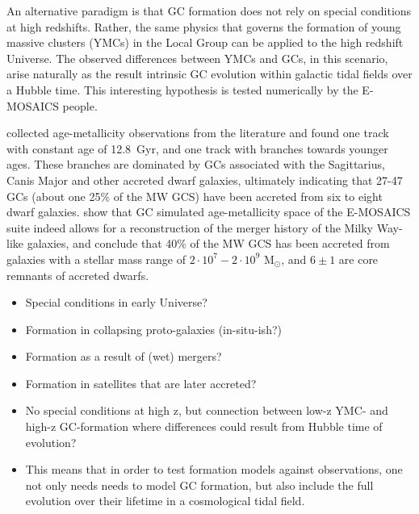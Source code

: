 \documentclass[a4paper,fleqn,usenatbib]{mnras}
\newcommand{\Sun}[0]{\ensuremath{_{\odot}}}
\begin{document}
An alternative paradigm is that GC formation does not rely on special conditions
at high redshifts. Rather, the same physics that governs the formation of young 
massive clusters (YMCs) in the Local Group can be applied to the high redshift
Universe. The observed differences between YMCs and GCs, in this scenario, arise
naturally as the result intrinsic GC evolution within galactic tidal fields over
a Hubble time. This interesting hypothesis is tested numerically by the E-MOSAICS
people.


\citet{2010MNRAS.404.1203F} collected age-metallicity observations from the
literature and found one track with constant age of 12.8~Gyr, and one track
with branches towards younger ages. These branches are dominated by GCs associated 
with the Sagittarius, Canis Major and other accreted dwarf galaxies, ultimately
indicating that 27-47 GCs (about one 25\% of the MW GCS) have been accreted
from six to eight dwarf galaxies. \citet{2019MNRAS.486.3134K, 2019MNRAS.486.3180K}
show that GC simulated age-metallicity space of the E-MOSAICS suite indeed allows 
for a reconstruction of the merger history of the Milky Way-like galaxies, and 
conclude that 40\% of the MW GCS has been accreted from galaxies with a stellar
mass range of $2 \cdot 10^{7} - 2 \cdot 10^{9}$ M\Sun, and $6\pm1$ are core remnants
of accreted dwarfs.



%
%


\begin{itemize}
    \item Special conditions in early Universe?
    \item Formation in collapsing proto-galaxies (in-situ-ish?)
    \item Formation as a result of (wet) mergers?
    \item Formation in satellites that are later accreted?
    \item No special conditions at high z, but connection between low-z YMC-
        and high-z GC-formation where differences could result from Hubble time
        of evolution?
    \item This means that in order to test formation models against observations,
        one not only needs needs to model GC formation, but also include the full
        evolution over their lifetime in a cosmological tidal field.
\end{itemize}
\end{document}
